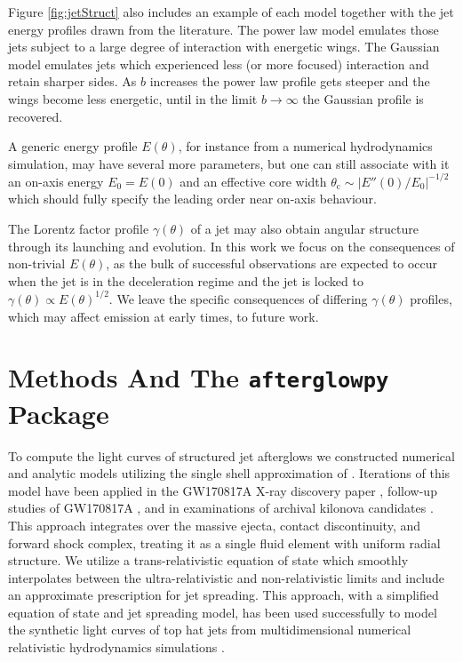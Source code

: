 \documentclass[twocolumn]{aastex62}
\newcommand{\gwbns}{GW170817A}
\newcommand{\afterglowpy}{{\tt afterglowpy}}
\newcommand{\thC}{\ensuremath{\theta_{\mathrm{c}}}}
\begin{document}
Figure \ref{fig:jetStruct} also includes an example of each model together with the jet energy profiles drawn from the literature.  The power law model emulates those jets subject to a large degree of interaction with energetic wings.  The Gaussian model emulates jets which experienced less (or more focused) interaction and retain sharper sides.  As $b$ increases the power law profile gets steeper and the wings become less energetic, until in the limit $b\to \infty$ the Gaussian profile is recovered.

A generic energy profile $E(\theta)$, for instance from a numerical hydrodynamics simulation, may have several more parameters, but one can still associate with it an on-axis energy $E_0 = E(0)$ and an effective core width $\thC \sim |E''(0)/E_0|^{-1/2}$ which should fully specify the leading order near on-axis behaviour.  

The Lorentz factor profile $\gamma(\theta)$ of a jet may also obtain angular structure through its launching and evolution.  In this work we focus on the consequences of non-trivial $E(\theta)$, as the bulk of successful observations are expected to occur when the jet is in the deceleration regime and the jet is locked to $\gamma(\theta) \propto E(\theta)^{1/2}$.  We leave the specific consequences of differing $\gamma(\theta)$ profiles, which may affect emission at early times, to future work.


%
%


\section{Methods And The \afterglowpy{} Package}\label{sec:numerical}

To compute the light curves of structured jet afterglows we constructed numerical and analytic models utilizing the single shell approximation of \cite{van-Eerten:2010aa, van-Eerten:2018ab}.  Iterations of this model have been applied in the \gwbns{} X-ray discovery paper \citep{Troja:2017aa}, follow-up studies of \gwbns{} \citep{Troja:2018aa, Piro:2019aa, Troja:2019ab}, and in examinations of archival kilonova candidates \citep{Troja:2018ab, Troja:2019aa}. This approach integrates over the massive ejecta, contact discontinuity, and forward shock complex, treating it as a single fluid element with uniform radial structure. We utilize a trans-relativistic equation of state which smoothly interpolates between the ultra-relativistic and non-relativistic limits \citep{van-Eerten:2013ab, Nava:2013aa} and include an approximate prescription for jet spreading.  This approach, with a simplified equation of state and jet spreading model, has been used successfully to model the synthetic light curves of top hat jets from multidimensional numerical relativistic hydrodynamics simulations \citep{van-Eerten:2010aa}.
\end{document}
